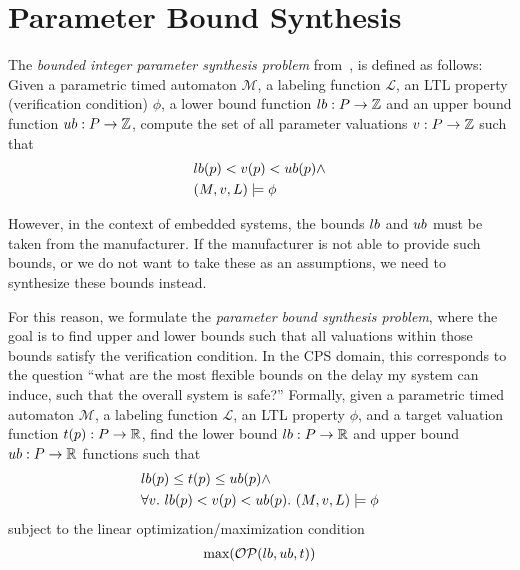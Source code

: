 \section{Parameter Bound Synthesis}
 
The \textit{bounded integer parameter synthesis problem} from~\cite{DBLP:journals/corr/BezdekBHBC14}, is defined as follows:
Given a parametric timed automaton $\mathcal{M}$, a labeling function $\mathcal{L}$, an LTL property (verification condition) $\phi$, a lower bound function $lb: P \to \mathbb{Z}$ and an upper bound function $ub: P \to \mathbb{Z} $, 
  compute the set of all parameter valuations $v: P \to \mathbb{Z}$ such that 
\begin{align*}
  &lb(p) < v(p) < ub(p) \land \\
  &(M,v,L) \models \phi
\end{align*}

However, in the context of embedded systems, the bounds $lb$ and $ub$ must be taken from the manufacturer.
If the manufacturer is not able to provide such bounds, or we do not want to take these as an assumptions, we need to synthesize these bounds instead.

For this reason, we formulate the \textit{parameter bound synthesis problem}, where the goal is to find upper and lower bounds such that all valuations within those bounds satisfy the verification condition.
In the CPS domain, this corresponds to the question ``what are the most flexible bounds on the delay my system can induce, such that the overall system is safe?''
Formally, given a parametric timed automaton $\mathcal{M}$, a labeling function $\mathcal{L}$, an LTL property $\phi$, and a target valuation function $t(p): P \to \mathbb{R}$,
find the lower bound $lb: P \to \mathbb{R}$ and upper bound $ub : P \to \mathbb{R}$ functions such that 
%
\begin{align*}
  &lb(p) \leq t(p) \leq ub(p) \land \\ 
  &\forall v.\ lb(p) < v(p) < ub(p).\ (M, v,L) \models \phi
\end{align*}
%
subject to the linear optimization/maximization condition 
\begin{align*}
\text{max}(\mathcal{OP}(lb,ub,t))
\end{align*}

